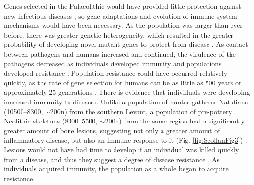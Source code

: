 Genes selected in the Palaeolithic would have provided little protection against new infectious 
diseases \parencite[115]{Armelagos_2005}, 
so gene adaptations and evolution of immune system mechanisms would have been necessary. 
As the population was larger than ever before, there was greater genetic heterogeneity, 
which resulted in the greater probability of developing novel mutant genes to protect 
from disease \parencite[273]{Armelagos_1970}. 
As contact between pathogens and humans increased and continued, 
the virulence of the pathogens decreased as individuals developed 
immunity and populations developed resistance \parencites{Dubos_1975}{Motulsky_1960}. 
Population resistance could have occurred relatively quickly, as the 
rate of gene selection for humans can be as little as 500 years or approximately 25 generations \parencite[253--255]{Kingsolver_2001}. 
There is evidence that individuals were developing increased immunity to diseases. 
Unlike a population of hunter-gatherer Natufians (10500--8300\BC, $\sim$200n) from the southern Levant, a population of pre-pottery Neolithic skeletons (8300--5500\BC, $\sim$200n) from the same region had a significantly greater amount of bone lesions, suggesting not only a greater amount of inflammatory disease, but also an immune response to it (Fig. \ref{fig:ScollanFig3}) \parencite[128]{Eshed_2010}. 
Lesions would not have had time to develop if an individual was 
killed quickly from a disease, and thus they suggest a degree of disease resistance \parencite{Wood_1992}. 
As individuals acquired immunity, the population as a whole began to acquire resistance.

